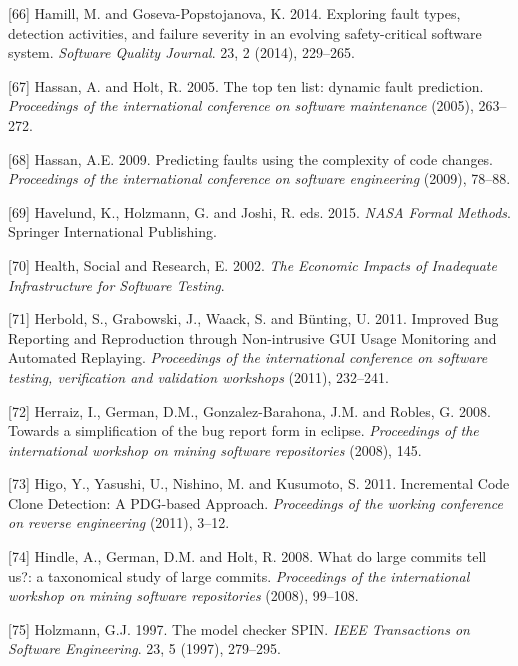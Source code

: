 \documentclass[12pt]{report}
\begin{document}
\hypertarget{ref-Hamill2014}{}
{[}66{]} Hamill, M. and Goseva-Popstojanova, K. 2014. Exploring fault
types, detection activities, and failure severity in an evolving
safety-critical software system. \emph{Software Quality Journal}. 23, 2
(2014), 229--265.

\hypertarget{ref-Hassan2005}{}
{[}67{]} Hassan, A. and Holt, R. 2005. The top ten list: dynamic fault
prediction. \emph{Proceedings of the international conference on
software maintenance} (2005), 263--272.

\hypertarget{ref-Hassan2009}{}
{[}68{]} Hassan, A.E. 2009. Predicting faults using the complexity of
code changes. \emph{Proceedings of the international conference on
software engineering} (2009), 78--88.

\hypertarget{ref-Havelund2015}{}
{[}69{]} Havelund, K., Holzmann, G. and Joshi, R. eds. 2015. \emph{NASA
Formal Methods}. Springer International Publishing.

\hypertarget{ref-HealthSocial2002}{}
{[}70{]} Health, Social and Research, E. 2002. \emph{The Economic
Impacts of Inadequate Infrastructure for Software Testing}.

\hypertarget{ref-Herbold2011}{}
{[}71{]} Herbold, S., Grabowski, J., Waack, S. and Bünting, U. 2011.
Improved Bug Reporting and Reproduction through Non-intrusive GUI Usage
Monitoring and Automated Replaying. \emph{Proceedings of the
international conference on software testing, verification and
validation workshops} (2011), 232--241.

\hypertarget{ref-Herraiz2008}{}
{[}72{]} Herraiz, I., German, D.M., Gonzalez-Barahona, J.M. and Robles,
G. 2008. Towards a simplification of the bug report form in eclipse.
\emph{Proceedings of the international workshop on mining software
repositories} (2008), 145.

\hypertarget{ref-Higo2011}{}
{[}73{]} Higo, Y., Yasushi, U., Nishino, M. and Kusumoto, S. 2011.
Incremental Code Clone Detection: A PDG-based Approach.
\emph{Proceedings of the working conference on reverse engineering}
(2011), 3--12.

\hypertarget{ref-Hindle2008}{}
{[}74{]} Hindle, A., German, D.M. and Holt, R. 2008. What do large
commits tell us?: a taxonomical study of large commits.
\emph{Proceedings of the international workshop on mining software
repositories} (2008), 99--108.

\hypertarget{ref-holzmann1997model}{}
{[}75{]} Holzmann, G.J. 1997. The model checker SPIN. \emph{IEEE
Transactions on Software Engineering}. 23, 5 (1997), 279--295.
\end{document}
